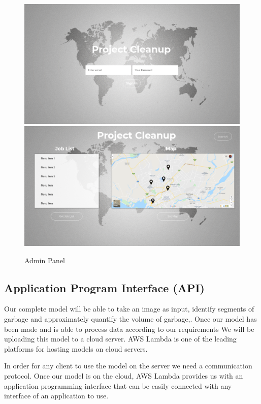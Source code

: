 \newpage
\begin{figure}[!hb]
   \centering

   \includegraphics[scale=0.8]{images/6.png}
 \\
   \includegraphics[scale=0.8]{images/7.png}
 
   \caption{Admin Panel}\label{fig:picture}
\end{figure}
\subsection{Application Program Interface (API)}
Our complete model will be able to take an image as input, identify segments of garbage and approximately quantify the volume of garbage,. Once our model has been made and is able to process data according to our requirements We will be uploading this model to a cloud server. AWS Lambda is one of the leading platforms for hosting models on cloud servers. 

In order for any client to use the model on the server we need a communication protocol. Once our model is on the cloud, AWS Lambda provides us with an application programming interface that can be easily connected with any interface of an application to use.
\newpage
